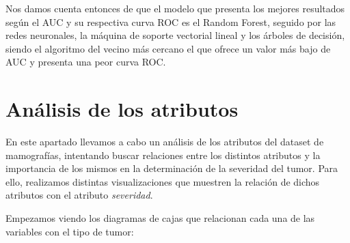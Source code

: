 \documentclass[a4paper,11pt]{book}
\begin{document}
Nos damos cuenta entonces de que el modelo que presenta los mejores resultados según el AUC y su respectiva curva ROC es el Random Forest, seguido por las redes neuronales, la máquina de soporte vectorial lineal y los árboles de decisión, siendo el algoritmo del vecino más cercano el que ofrece un valor más bajo de AUC y presenta una peor curva ROC. 

\newpage
\section{Análisis de los atributos}

En este apartado llevamos a cabo un análisis de los atributos del dataset de mamografías, intentando buscar relaciones entre los distintos atributos y la importancia de los mismos en la determinación de la severidad del tumor. Para ello, realizamos distintas visualizaciones que muestren la relación de dichos atributos con el atributo \textit{severidad}. 

Empezamos viendo los diagramas de cajas que relacionan cada una de las variables con el tipo de tumor:
\end{document}
